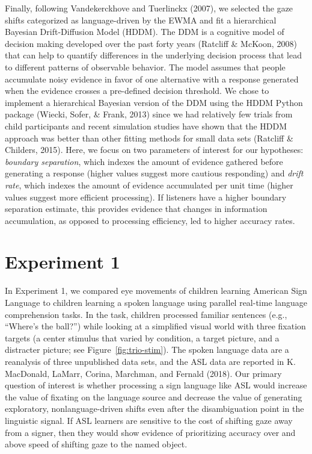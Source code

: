 \documentclass[,man,floatsintext]{apa6}
\begin{document}
Finally, following Vandekerckhove and Tuerlinckx (2007), we selected the
gaze shifts categorized as language-driven by the EWMA and fit a
hierarchical Bayesian Drift-Diffusion Model (HDDM). The DDM is a
cognitive model of decision making developed over the past forty years
(Ratcliff \& McKoon, 2008) that can help to quantify differences in the
underlying decision process that lead to different patterns of
observable behavior. The model assumes that people accumulate noisy
evidence in favor of one alternative with a response generated when the
evidence crosses a pre-defined decision threshold. We chose to implement
a hierarchical Bayesian version of the DDM using the HDDM Python package
(Wiecki, Sofer, \& Frank, 2013) since we had relatively few trials from
child participants and recent simulation studies have shown that the
HDDM approach was better than other fitting methods for small data sets
(Ratcliff \& Childers, 2015). Here, we focus on two parameters of
interest for our hypotheses: \emph{boundary separation}, which indexes
the amount of evidence gathered before generating a response (higher
values suggest more cautious responding) and \emph{drift rate}, which
indexes the amount of evidence accumulated per unit time (higher values
suggest more efficient processing). If listeners have a higher boundary
separation estimate, this provides evidence that changes in information
accumulation, as opposed to processing efficiency, led to higher
accuracy rates.

\section{Experiment 1}\label{experiment-1}

In Experiment 1, we compared eye movements of children learning American
Sign Language to children learning a spoken language using parallel
real-time language comprehension tasks. In the task, children processed
familiar sentences (e.g., \enquote{Where's the ball?}) while looking at
a simplified visual world with three fixation targets (a center stimulus
that varied by condition, a target picture, and a distracter picture;
see Figure~\ref{fig:trio-stim}). The spoken language data are a
reanalysis of three unpublished data sets, and the ASL data are reported
in K. MacDonald, LaMarr, Corina, Marchman, and Fernald (2018). Our
primary question of interest is whether processing a sign language like
ASL would increase the value of fixating on the language source and
decrease the value of generating exploratory, nonlanguage-driven shifts
even after the disambiguation point in the linguistic signal. If ASL
learners are sensitive to the cost of shifting gaze away from a signer,
then they would show evidence of prioritizing accuracy over and above
speed of shifting gaze to the named object.
\end{document}
